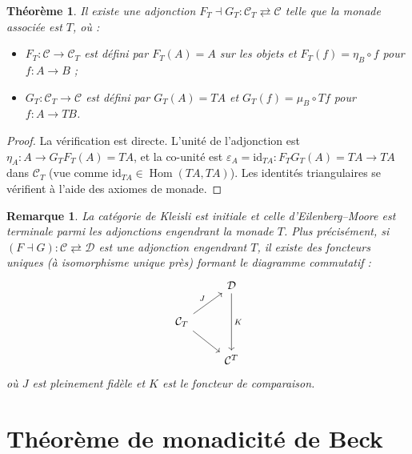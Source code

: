 \documentclass[a4paper,12pt]{book}
\DeclareMathOperator{\Hom}{Hom}
\newcommand{\id}{\mathrm{id}}
\newtheorem{theoreme}{Théorème}[chapter]
\newtheorem*{remarque}{Remarque}
\begin{document}
\begin{theoreme}\label{thm:adjonction-kleisli}
Il existe une adjonction $F_T \dashv G_T \colon \mathcal{C}_T
\rightleftarrows \mathcal{C}$ telle que la monade associée est $T$, où :
\begin{itemize}
    \item $F_T \colon \mathcal{C} \to \mathcal{C}_T$ est défini par
    $F_T(A) = A$ sur les objets et $F_T(f) = \eta_B \circ f$ pour
    $f \colon A \to B$ ;
    \item $G_T \colon \mathcal{C}_T \to \mathcal{C}$ est défini par
    $G_T(A) = TA$ et $G_T(f) = \mu_B \circ Tf$ pour $f \colon A \to TB$.
\end{itemize}
\end{theoreme}

\begin{proof}
La vérification est directe. L'unité de l'adjonction est
$\eta_A \colon A \to G_T F_T(A) = TA$, et la co-unité est
$\varepsilon_A = \id_{TA} \colon F_T G_T(A) = TA \to TA$ dans
$\mathcal{C}_T$ (vue comme $\id_{TA} \in \Hom(TA, TA)$).
Les identités triangulaires se vérifient à l'aide des axiomes de monade.
\end{proof}

\begin{remarque}\label{rem:kleisli-EM-universalite}
La catégorie de Kleisli est \emph{initiale} et celle d'Eilenberg--Moore
est \emph{terminale} parmi les adjonctions engendrant la monade $T$.
Plus précisément, si $(F \dashv G) \colon \mathcal{C} \rightleftarrows
\mathcal{D}$ est une adjonction engendrant $T$, il existe des foncteurs
uniques (à isomorphisme unique près) formant le diagramme commutatif :
\[
\begin{tikzcd}
& \mathcal{D} \arrow[dd, "K"] \\
\mathcal{C}_T \arrow[ur, "J"] \arrow[dr] & \\
& \mathcal{C}^T
\end{tikzcd}
\]
où $J$ est pleinement fidèle et $K$ est le foncteur de comparaison.
\end{remarque}


\section{Théorème de monadicité de Beck}\label{sec:beck}
\end{document}
